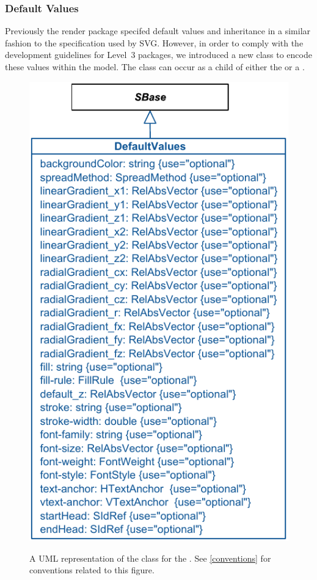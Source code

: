 \subsubsection{Default Values}
\label{defaultvalues-class}
Previously the render package specifed default values and inheritance in a similar fashion to the specification used by SVG. However, in order to comply with the \SBML 
development guidelines for Level~3 packages, we introduced a new class \DefaultValues to encode these values within the model. 
The \DefaultValues class can occur as a child of either the \ListOfGlobalRenderInformation or a 
\ListOfLocalRenderInformation. 

\begin{figure}[h!]
  \centering
  \includegraphics{images/render-default-values}\\
  \caption{A UML representation of the \DefaultValues class for the \RenderPackage.  See \ref{conventions} for conventions related to this figure. }
  \label{fig:default-values}
\end{figure}

